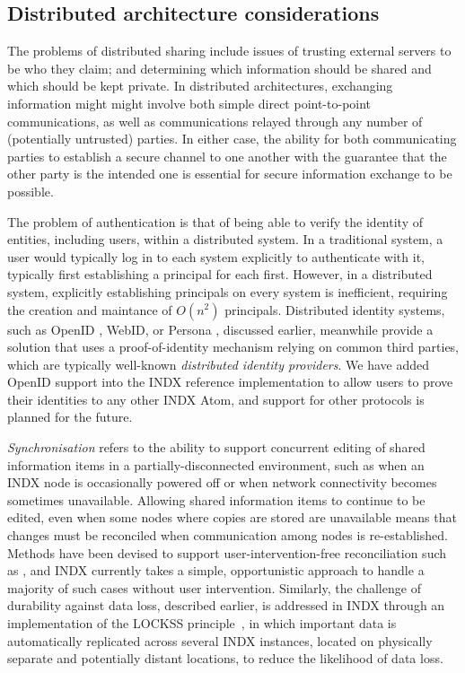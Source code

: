 \documentclass[letterpaper]{sig-alternate}
\begin{document}
\subsection{Distributed architecture considerations}

The problems of distributed sharing include issues of trusting external servers to be who they claim; and determining which information should be shared and which should be kept private.  In distributed architectures, exchanging information might  might involve both simple direct point-to-point communications, as well as communications relayed through any number of (potentially untrusted) parties.  In either case, the ability for both communicating parties to establish a secure channel to one another with the guarantee that the other party is the intended one is essential for secure information exchange to be possible.

The problem of authentication is that of being able to verify the identity of entities, including users, within a distributed system. In a traditional system, a user would typically log in to each system explicitly to authenticate with it, typically first establishing a principal for each first.  However, in a distributed system, explicitly establishing principals on every system is inefficient, requiring the creation and maintance of $O(n^2)$ principals.  Distributed identity systems, such as OpenID \cite{recordon2006openid}, WebID\cite{huang2000webid}, or Persona \cite{koshutanski2007distributed}, discussed earlier, meanwhile provide a solution that uses a proof-of-identity mechanism relying on common third parties, which are typically well-known  \emph{distributed identity providers}. We have added OpenID support into the INDX reference implementation to allow users to prove their identities to any other INDX Atom, and support for other protocols is planned for the future.

\emph{Synchronisation} refers to the ability to support concurrent editing of shared information items in a partially-disconnected environment, such as when an INDX node is occasionally powered off or when network connectivity becomes sometimes unavailable.  Allowing shared information items to continue to be edited, even when some nodes where copies are stored are unavailable means that changes must be reconciled when communication among nodes is re-established.  Methods have been devised to support user-intervention-free reconciliation such as \cite{sun1998operational}, and INDX currently takes a simple, opportunistic approach to handle a majority of such cases without user intervention.  Similarly, the challenge of durability against data loss, described earlier, is addressed in INDX through an implementation of the LOCKSS principle~\cite{reich2001lockss}, in which important data is automatically replicated across several INDX instances, located on physically separate and potentially distant locations, to reduce the likelihood of data loss.
\end{document}
